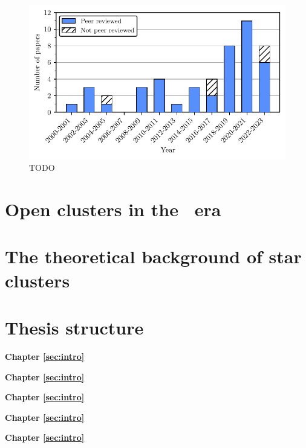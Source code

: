 \begin{figure}[htb]
	\includegraphics[width=\textwidth]{fig/c1/papers.pdf}
	\caption{TODO}
	\label{fig:intro:history:papers}
\end{figure}


\section{Open clusters in the \gaia\ era}


\section{The theoretical background of star clusters}


\section{Thesis structure}
\label{sec:intro:structure}

\textbf{Chapter \ref{sec:intro}} \\[0.2em]
\blindtext

\textbf{Chapter \ref{sec:intro}} \\[0.2em]
\blindtext

\textbf{Chapter \ref{sec:intro}} \\[0.2em]
\blindtext

\textbf{Chapter \ref{sec:intro}} \\[0.2em]
\blindtext

\textbf{Chapter \ref{sec:intro}} \\[0.2em]
\blindtext
